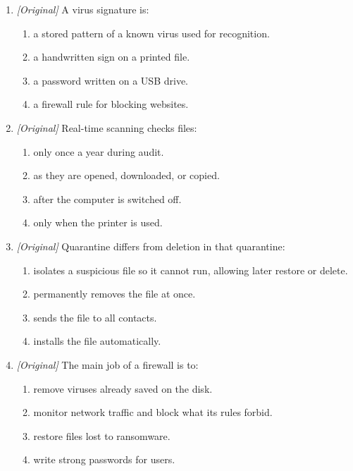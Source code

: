 \documentclass[11pt]{article}
\begin{document}
\begin{enumerate}[label=\textbf{Q\arabic*.}, leftmargin=*]
\begin{enumerate}[label=\Alph*.]
    \item all files are encrypted.
    \item no backup is required.
  \end{enumerate}
\item \textit{[Original]} A virus signature is:
  \begin{enumerate}[label=\Alph*.]
    \item a stored pattern of a known virus used for recognition.
    \item a handwritten sign on a printed file.
    \item a password written on a USB drive.
    \item a firewall rule for blocking websites.
  \end{enumerate}
\item \textit{[Original]} Real-time scanning checks files:
  \begin{enumerate}[label=\Alph*.]
    \item only once a year during audit.
    \item as they are opened, downloaded, or copied.
    \item after the computer is switched off.
    \item only when the printer is used.
  \end{enumerate}
\item \textit{[Original]} Quarantine differs from deletion in that quarantine:
  \begin{enumerate}[label=\Alph*.]
    \item isolates a suspicious file so it cannot run, allowing later restore or delete.
    \item permanently removes the file at once.
    \item sends the file to all contacts.
    \item installs the file automatically.
  \end{enumerate}
\item \textit{[Original]} The main job of a firewall is to:
  \begin{enumerate}[label=\Alph*.]
    \item remove viruses already saved on the disk.
    \item monitor network traffic and block what its rules forbid.
    \item restore files lost to ransomware.
    \item write strong passwords for users.
  \end{enumerate}

\end{enumerate}
\end{document}
